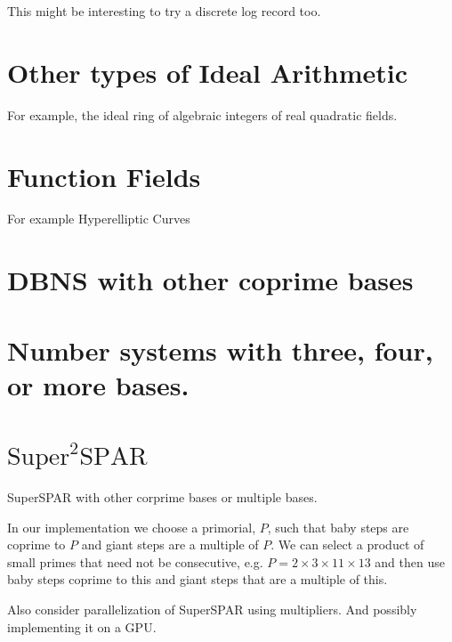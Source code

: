 \documentclass{ucalgthes1}
\theoremstyle{definition}
\begin{document}
This might be interesting to try a discrete log record too.

\section{Other types of Ideal Arithmetic}
For example, the ideal ring of algebraic integers of real quadratic fields.

\section{Function Fields}

For example Hyperelliptic Curves

\section{DBNS with other coprime bases}

\section{Number systems with three, four, or more bases.}

\section{$\textrm{Super}^2\textrm{SPAR}$}

SuperSPAR with other corprime bases or multiple bases.

In our implementation we choose a primorial, $P$, such that baby steps are coprime to $P$ and giant steps are a multiple of $P$.  We can select a product of small primes that need not be consecutive, e.g. $P = 2 \times 3 \times 11 \times 13$ and then use baby steps coprime to this and giant steps that are a multiple of this.

Also consider parallelization of SuperSPAR using multipliers.  And possibly implementing it on a GPU.




\end{document}
